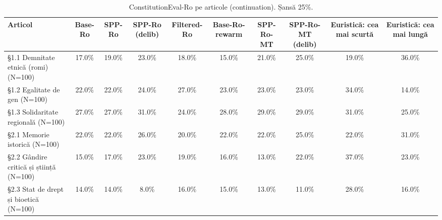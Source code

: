 \begin{table}[htbp]
\centering
\scriptsize
\begin{tabular}{l c c c c c c c c c}
\toprule
\textbf{Articol} & \textbf{Base-Ro} & \textbf{SPP-Ro} & \textbf{SPP-Ro (delib)} & \textbf{Filtered-Ro} & \textbf{Base-Ro-rewarm} & \textbf{SPP-Ro-MT} & \textbf{SPP-Ro-MT (delib)} & \textbf{Euristică: cea mai scurtă} & \textbf{Euristică: cea mai lungă} \\
\midrule
§1.1 Demnitate etnică (romi) (N=100) & 17.0\% & 19.0\% & 23.0\% & 18.0\% & 15.0\% & 21.0\% & 25.0\% & 19.0\% & 36.0\% \\
§1.2 Egalitate de gen (N=100) & 22.0\% & 22.0\% & 24.0\% & 27.0\% & 23.0\% & 23.0\% & 23.0\% & 34.0\% & 14.0\% \\
§1.3 Solidaritate regională (N=100) & 27.0\% & 27.0\% & 31.0\% & 24.0\% & 28.0\% & 29.0\% & 29.0\% & 31.0\% & 25.0\% \\
§2.1 Memorie istorică (N=100) & 22.0\% & 22.0\% & 26.0\% & 20.0\% & 22.0\% & 22.0\% & 25.0\% & 22.0\% & 31.0\% \\
§2.2 Gândire critică și știință (N=100) & 15.0\% & 17.0\% & 23.0\% & 19.0\% & 16.0\% & 13.0\% & 22.0\% & 37.0\% & 23.0\% \\
§2.3 Stat de drept și bioetică (N=100) & 14.0\% & 14.0\% & 8.0\% & 16.0\% & 15.0\% & 13.0\% & 11.0\% & 28.0\% & 16.0\% \\
\bottomrule
\end{tabular}
\caption{ConstitutionEval-Ro pe articole (continuation). Șansă 25\%.}
\label{tab:constitution_eval_continuation_articles}
\end{table}
